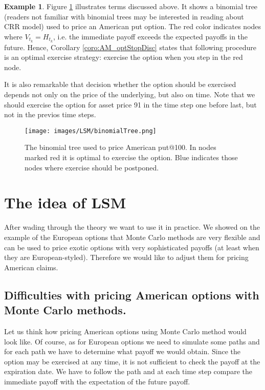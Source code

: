 \documentclass[a4paper,12pt, oneside]{book}
\theoremstyle{definition}
\newtheorem{example}{Example}[chapter]
\theoremstyle{remark}
\begin{document}
\begin{example}
 Figure \ref{fig:binTree} illustrates terms discussed above. It shows a binomial tree (readers not familiar with binomial trees may be interested in reading about CRR model) used to price an American put option. The red color indicates nodes where $V_{t_k} = H_{t_k}$, i.e. the immediate payoff exceeds the expected payoffs in the future. Hence, Corollary \ref{coro:AM_optStopDisc} states that following procedure is an optimal exercise strategy: exercise the option when you step in the red node.
 
 It is also remarkable that decision whether the option should be exercised depends not only on the price of the underlying, but also on time. Note that we should exercise the option for asset price 91 in the time step one before last, but not in the previos time steps.
\end{example}

\begin{figure}[!ht]
\centering
 \texttt{[image: images/LSM/binomialTree.png]}
\caption{The binomial tree used to price American put@100. In nodes marked red it is optimal to exercise the option. Blue indicates those nodes where exercise should be postponed. }
\label{fig:binTree}
\end{figure}

\section{The idea of LSM}
After wading through the theory we want to use it in practice. We showed on the example of the European options that Monte Carlo methods are very flexible and can be used to price exotic options with very sophisticated payoffs (at least when they are European-styled). Therefore we would like to adjust them for pricing American claims. 

\subsection{Difficulties with pricing American options with Monte Carlo methods.}

Let us think how pricing American options using Monte Carlo method would look like. Of course, as for European options we need to simulate some paths and for each path we have to determine what payoff we would obtain. Since the option may be exercised at any time, it is not sufficient to check the payoff at the expiration date. We have to follow the path and at each time step compare the immediate payoff with the expectation of the future payoff.
\end{document}
